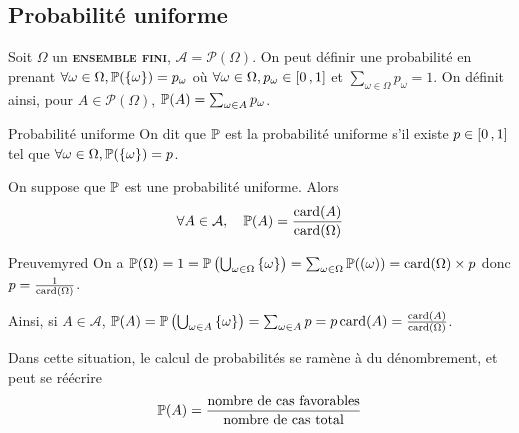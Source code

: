     \subsection{Probabilité uniforme}

    Soit $\Omega$ un \textbf{\textsc{ensemble fini}}, $\mathcal{A} = \mathcal{P}(\Omega)$. On peut définir une probabilité en prenant $\forall \omega \in \Omega, \P(\left\{\omega\right\}) = p_{\omega}$ où $\forall \omega \in \Omega, p_{\omega} \in \intervalleFF{0}{1}$ et $\sum_{\omega \in \Omega} p_{\omega} = 1$. On définit ainsi, pour $A \in \mathcal{P}(\Omega)$, $\P(A) = \sum_{\omega \in A} p_{\omega}$.

    \begin{defi}{Probabilité uniforme}{}
        On dit que $\P$ est la probabilité uniforme s’il existe $p \in \intervalleFF{0}{1}$ tel que $\forall \omega \in \Omega, \P(\left\{\omega\right\}) = p$.
    \end{defi}

    \begin{theo}{}{}
        On suppose que $\P$ est une probabilité uniforme. Alors
        \[ \forall A \in \mathcal{A}, \quad \P(A) = \frac{\card(A)}{\card(\Omega)} \]   
    \end{theo}

    \begin{demo}{Preuve}{myred}
        On a $\P(\Omega) = 1 = \P\left(\bigcup_{\omega \in \Omega} \left\{\omega\right\}\right) = \sum_{\omega \in \Omega} \P(\left(\omega\right)) = \card(\Omega) \times p$ donc $p = \frac{1}{\card(\Omega)}$.

        Ainsi, si $A \in \mathcal{A}$, $\P(A) = \P\left(\bigcup_{\omega \in A} \left\{\omega\right\}\right) = \sum_{\omega \in A} p = p \card(A) = \frac{\card(A)}{\card(\Omega)}$.
    \end{demo}

    Dans cette situation, le calcul de probabilités se ramène à du dénombrement, et peut se réécrire 
    \[ \P(A) = \frac{\text{nombre de cas favorables}}{\text{nombre de cas total}} \]   

